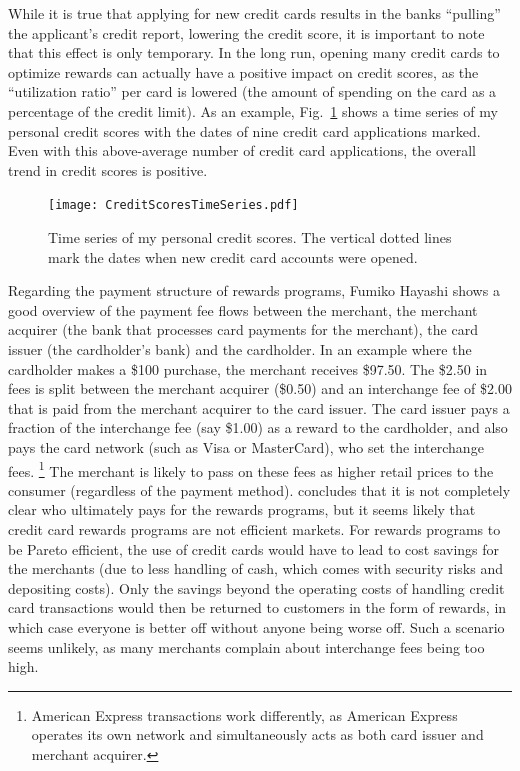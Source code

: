 While it is true that applying for new credit cards results in the banks ``pulling'' the applicant's credit report, lowering the credit score, it is important to note that this effect is only temporary. In the long run, opening many credit cards to optimize rewards can actually have a positive impact on credit scores, as the ``utilization ratio'' per card is lowered (the amount of spending on the card as a percentage of the credit limit). 
As an example, Fig.~\ref{fig:FICOTimeline} shows a time series of my personal credit scores with the dates of nine credit card applications marked. Even with this above-average number of credit card applications, the overall trend in credit scores is positive.

\begin{figure}[t!h]
    \begin{center}
    \texttt{[image: CreditScoresTimeSeries.pdf]}
    \caption{Time series of my personal credit scores. The vertical dotted lines mark the dates when new credit card accounts were opened.}
    \label{fig:FICOTimeline}
    \end{center}
\end{figure}

Regarding the payment structure of rewards programs, Fumiko Hayashi \citeyearpar{hayashi:2009} shows a good overview of the payment fee flows between the merchant, the merchant acquirer (the bank that processes card payments for the merchant), the card issuer (the cardholder's bank) and the cardholder.
In an example where the cardholder makes a \$100 purchase, the merchant receives \$97.50. The \$2.50 in fees is split between the merchant acquirer (\$0.50) and an interchange fee of \$2.00 that is paid from the merchant acquirer to the card issuer. The card issuer pays a fraction of the interchange fee (say \$1.00) as a reward to the cardholder, and also pays the card network (such as Visa or MasterCard), who set the interchange fees.%
\footnote{American Express transactions work differently, as American Express operates its own network and simultaneously acts as both card issuer and merchant acquirer.}
The merchant is likely to pass on these fees as higher retail prices to the consumer (regardless of the payment method). \citet{hayashi:2009} concludes that it is not completely clear who ultimately pays for the rewards programs, but it seems likely that credit card rewards programs are not efficient markets. 
For rewards programs to be Pareto efficient, the use of credit cards would have to lead to cost savings for the merchants (due to less handling of cash, which comes with security risks and depositing costs). 
Only the savings beyond the operating costs of handling credit card transactions would then be returned to customers in the form of rewards, in which case everyone is better off without anyone being worse off. Such a scenario seems unlikely, as many merchants complain about interchange fees being too high. 

